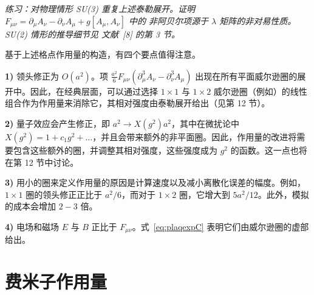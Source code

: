 \medskip
\noindent\textit{练习：对物理情形 SU(3) 重复上述泰勒展开。证明
$F_{\mu\nu} = \partial_\mu A_\nu - \partial_\nu A_\mu + g[A_\mu, A_\nu]$ 中的
非阿贝尔项源于 $\lambda$ 矩阵的非对易性质。SU(2) 情形的推导细节见
文献~[8] 的第 3 节。}
\medskip

基于上述格点作用量的构造，有四个要点值得注意。

\textbf{1)} 领头修正为 $O(a^2)$。项
$\frac{a^2}{6}F_{\mu\nu}(\partial_\mu^3 A_\nu - \partial_\nu^3 A_\mu)$
出现在所有平面威尔逊圈的展开中。因此，在经典层面，可以通过选择 $1\times1$
与 $1\times2$ 威尔逊圈（例如）的线性组合作为作用量来消除它，其相对强度由泰勒展开给出（见第 12 节）。

\textbf{2)} 量子效应会产生修正，即 $a^2 \to X(g^2)a^2$，其中在微扰论中
$X(g^2) = 1 + c_1 g^2 + \ldots$，并且会带来额外的非平面圈。因此，作用量的改进将需要包含这些额外的圈，并调整其相对强度，这些强度成为 $g^2$ 的函数。这一点也将在第 12 节中讨论。

\textbf{3)} 用小的圈来定义作用量的原因是计算速度以及减小离散化误差的幅度。例如，$1\times1$ 圈的领头修正正比于 $a^2/6$，而对于 $1\times2$ 圈，它增大到 $5a^2/12$。此外，模拟的成本会增加 $2-3$ 倍。

\textbf{4)} 电场和磁场 $E$ 与 $B$ 正比于 $F_{\mu\nu}$。式~\ref{eq:plaqexpC} 表明它们由威尔逊圈的虚部给出。

\section{费米子作用量}

